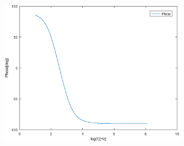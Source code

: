 \begin{figure}[H]
\begin{subfigure}{.55\textwidth}
  \includegraphics[width=1\linewidth]{phaseteo.eps}
\end{subfigure}
\end{figure}